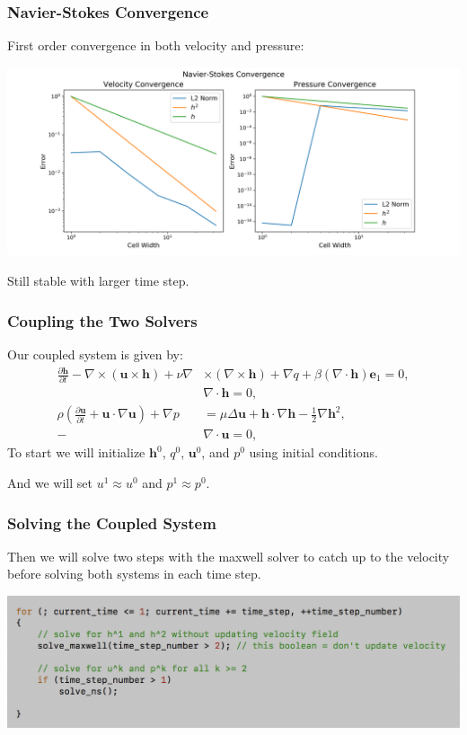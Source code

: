 \documentclass[mathserif]{beamer} %
\begin{document}
\begin{frame}
    \frametitle{Navier-Stokes Convergence}
    First order convergence in both velocity and pressure:

    \begin{center}
        \includegraphics[scale=.35]{ns_conv.png}
    \end{center}

    Still stable with larger time step.

\end{frame}

\begin{frame}
    \frametitle{Coupling the Two Solvers}
    Our coupled system is given by:
    \begin{align*}
        \frac{\partial \boldsymbol{h} }{\partial t} - \nabla \times (\boldsymbol{u}\times \boldsymbol{h}) + \nu \nabla &\times (\nabla \times \boldsymbol{h}) + \nabla q + \beta (\nabla \cdot \boldsymbol{h})\boldsymbol{e}_1= 0,\\
        &\nabla \cdot \boldsymbol{h} = 0,\\
        \rho \left(\frac{\partial \boldsymbol{u}}{\partial t} + \boldsymbol{u} \cdot \nabla \boldsymbol{u}\right) + \nabla p &= \mu \Delta \boldsymbol{u} + \boldsymbol{h}\cdot \nabla \boldsymbol{h} - \frac{1}{2}\nabla \boldsymbol{h}^2, \\
        -&\nabla \cdot \boldsymbol{u} = 0,\nonumber
    \end{align*}
    \pause
    To start we will initialize $\boldsymbol{h}^0$, $q^0$, $\boldsymbol{u}^0$, and $p^0$ using initial conditions. 
    \pause

    And we will set $u^1 \approx u^0$ and $p^1 \approx p^0$.
\end{frame}

\begin{frame}
    \frametitle{Solving the Coupled System}
    
    Then we will solve two steps with the maxwell solver to catch up to the velocity before solving both systems in each time step.
    \pause

    \vspace{.4cm}
    \includegraphics[scale=.45]{solver.png}
      
\end{frame}
\end{document}
